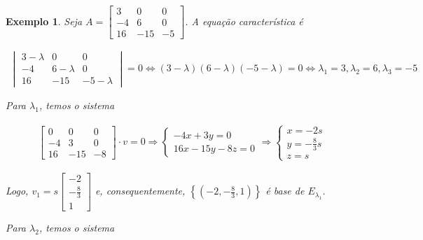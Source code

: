 \documentclass{article}
\newtheorem*{example}{Exemplo}
\begin{document}
\begin{example}
	Seja $A = \begin{bmatrix}
	3 & 0 & 0 \\
	-4 & 6 & 0 \\
	16 & -15 & -5
	\end{bmatrix}$. A equação característica é 
	
	\begin{align*}
	\begin{vmatrix}
	3-\lambda & 0 & 0 \\
	-4 & 6-\lambda & 0 \\
	16 & -15 & -5-\lambda
	\end{vmatrix} = 0 \Leftrightarrow (3-\lambda)(6-\lambda)(-5-\lambda) = 0 \Leftrightarrow \lambda_1 = 3, \lambda_2 = 6, \lambda_3 = -5
	\end{align*}
	
	\par\vspace{0.3cm} Para $\lambda_1$, temos o sistema
	
	\begin{align*}
	\begin{bmatrix}
	0 & 0 & 0 \\
	-4 & 3 & 0 \\
	16 & -15 & -8  
	\end{bmatrix}\cdot v = 0 \Rightarrow \begin{cases}
	-4x + 3y = 0\\
	16x - 15y - 8z = 0
	\end{cases} \Rightarrow \begin{cases}
	x = -2s\\
	y = \displaystyle{-\frac{8}{3}}s\\
	z = s
	\end{cases}
	\end{align*}
	
	\par\vspace{0.3cm} Logo, $v_1 = s\begin{bmatrix}
	-2\\
	\displaystyle{-\frac{8}{3}}\\
	1
	\end{bmatrix}$ e, consequentemente, $\left\{  \left(-2, \displaystyle{-\frac{8}{3}}, 1\right)   \right\}$ é base de $E_{\lambda_1}$.
	
	\par\vspace{0.3cm} Para $\lambda_2$, temos o sistema
	

\end{example}
\end{document}
